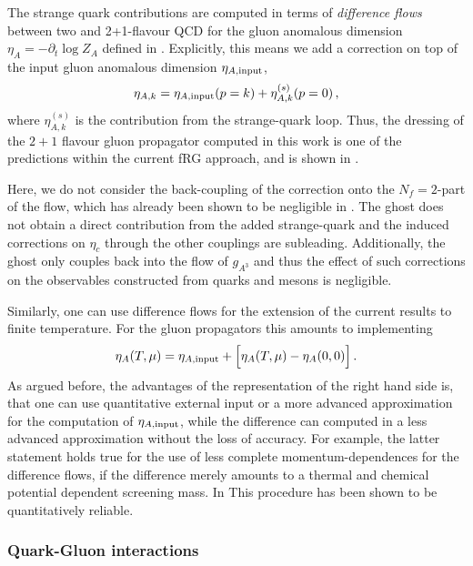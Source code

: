 \documentclass[aps,twocolumn,prd,superscriptaddress]{revtex4-2}
\begin{document}
The strange quark contributions are computed in terms of \textit{difference flows} between two and 2+1-flavour QCD for the gluon anomalous dimension $\eta_A=-\partial_t \log Z_A$ defined in . Explicitly, this means we add a correction on top of the input gluon anomalous dimension $\eta_{A,\rm{input}}$,
%
\begin{align}
	\eta_{A,k} = \eta_{A,\rm{input}}(p=k) + \eta_{A, k}^{(s)}(p=0)\,,
\end{align}
%
where $\eta_{A,k}^{(s)}$ is the contribution from the strange-quark loop.
Thus, the dressing of the $2+1$ flavour gluon propagator computed in this work is one of the predictions within the current fRG approach, and is shown in . 

Here, we do not consider the back-coupling of the correction onto the $N_f=2$-part of the flow, which has already been shown to be negligible in \cite{Fu:2019hdw}. The ghost does not obtain a direct contribution from the added strange-quark and the induced corrections on $\eta_c$ through the other couplings are subleading. Additionally, the ghost only couples back into the flow of $g_{A^3}$ and thus the effect of such corrections on the observables constructed from quarks and mesons is negligible.

Similarly, one can use difference flows for the extension of the current results to finite temperature. For the gluon propagators this amounts to implementing 
%
\begin{align}
	\eta_{A}(T,\mu) = \eta_{A,\rm{input}} + \Big[\eta_{A}(T,\mu) - \eta_{A}(0,0)\Big]\,. 
\end{align}
%
As argued before, the advantages of the representation of the right hand side is, that one can use quantitative external input or a more advanced approximation for the computation of $\eta_{A,\rm{input}}$, while the difference can computed in a less advanced approximation without the loss of accuracy. For example, the latter statement holds true for the use of less complete momentum-dependences for the difference flows, if the difference merely amounts to a thermal and chemical potential dependent screening mass. In \cite{Fu:2019hdw} This procedure has been shown to be quantitatively reliable. 


\subsubsection{Quark-Gluon interactions}
\label{sec:Ie}
\end{document}
